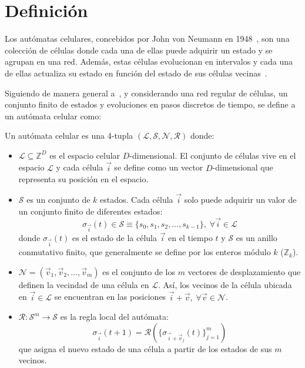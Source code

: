 \section{Definición}
\label{sec:definicion}

Los autómatas celulares, concebidos por John von Neumann en 1948~\cite{damerow2010_neumann}, son una colección de células donde cada una de ellas puede adquirir un estado y se agrupan en una red. Además, estas células evolucionan en intervalos y cada una de ellas actualiza su estado en función del estado de sus células vecinas~\cite{weisstein2002_ca,wolfram1982_ca,fsancho2016_ca}.

Siguiendo de manera general a~\cite{bhattacharjee2019_ca,sayama2024_ca,Ilachinski2001_ca}, y considerando una red regular de células, un conjunto finito de estados y evoluciones en pasos discretos de tiempo, se define a un autómata celular como:

\begin{definition}
\label{def:ca}
Un autómata celular es una 4-tupla $(\mathcal{L}, \mathcal{S}, \mathcal{N}, \mathcal{R})$ donde:
\begin{itemize}
	\item $\mathcal{L} \subseteq \mathbb{Z}^D$ es el espacio celular $D$-dimensional. El conjunto de células vive en el espacio $\mathcal{L}$ y cada célula $\vec{i}$ se define como un vector $D$-dimensional que representa su posición en el espacio.

	\item $\mathcal{S}$ es un conjunto de $k$ estados. Cada célula $\vec{i}$ solo puede adquirir un valor de un conjunto finito de diferentes estados:
	\[
	\sigma_{\vec{i}}(t) \in \mathcal{S} \equiv \{ s_0, s_1, s_2, \dots, s_{k-1} \}, \; \forall \vec{i} \in \mathcal{L}
	\]
	donde $\sigma_{\vec{i}}(t)$ es el estado de la célula $\vec{i}$ en el tiempo $t$ y $\mathcal{S}$ es un anillo conmutativo finito, que generalmente se define por los enteros módulo $k$ ($\mathbb{Z}_k$).

	\item $\mathcal{N} = (\vec{v}_1, \vec{v}_2, \dots, \vec{v}_m)$ es el conjunto de los $m$ vectores de desplazamiento que definen la vecindad de una célula en $\mathcal{L}$. Así, los vecinos de la célula ubicada en $\vec{i} \in \mathcal{L}$ se encuentran en las posiciones $\vec{i} + \vec{v}, \; \forall \vec{v} \in \mathcal{N}$.

	\item $\mathcal{R} : \mathcal{S}^m \to \mathcal{S}$ es la regla local del autómata:
	\[
	\sigma_{\vec{i}}(t + 1) = \mathcal{R}\left( \{ \sigma_{\vec{i} + \vec{v}_j}(t) \}_{j=1}^{m} \right)
	\]
	que asigna el nuevo estado de una célula a partir de los estados de sus $m$ vecinos.
\end{itemize}
\end{definition}

